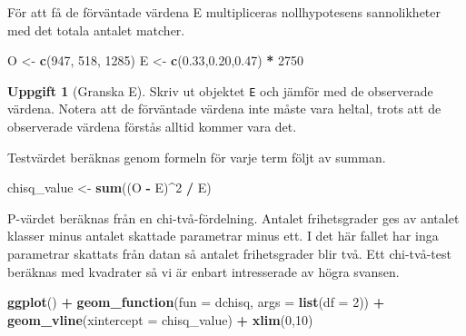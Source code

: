 \documentclass[
]{book}
\newenvironment{Shaded}{\begin{snugshade}}{\end{snugshade}}
\newcommand{\AttributeTok}[1]{\textcolor[rgb]{0.13,0.29,0.53}{#1}}
\newcommand{\DecValTok}[1]{\textcolor[rgb]{0.00,0.00,0.81}{#1}}
\newcommand{\FloatTok}[1]{\textcolor[rgb]{0.00,0.00,0.81}{#1}}
\newcommand{\FunctionTok}[1]{\textcolor[rgb]{0.13,0.29,0.53}{\textbf{#1}}}
\newcommand{\NormalTok}[1]{#1}
\newcommand{\OtherTok}[1]{\textcolor[rgb]{0.56,0.35,0.01}{#1}}
\newcommand{\SpecialCharTok}[1]{\textcolor[rgb]{0.81,0.36,0.00}{\textbf{#1}}}
\theoremstyle{definition}
\theoremstyle{definition}
\theoremstyle{definition}
\newtheorem{exercise}{Uppgift}[chapter]
\theoremstyle{definition}
\theoremstyle{remark}
\begin{document}
För att få de förväntade värdena E multipliceras nollhypotesens sannolikheter med det totala antalet matcher.

\begin{Shaded}
\begin{Highlighting}[]
\NormalTok{O }\OtherTok{\textless{}{-}} \FunctionTok{c}\NormalTok{(}\DecValTok{947}\NormalTok{, }\DecValTok{518}\NormalTok{, }\DecValTok{1285}\NormalTok{)}
\NormalTok{E }\OtherTok{\textless{}{-}} \FunctionTok{c}\NormalTok{(}\FloatTok{0.33}\NormalTok{,}\FloatTok{0.20}\NormalTok{,}\FloatTok{0.47}\NormalTok{) }\SpecialCharTok{*} \DecValTok{2750}
\end{Highlighting}
\end{Shaded}

\begin{exercise}[Granska E]
Skriv ut objektet \texttt{E} och jämför med de observerade värdena. Notera att de förväntade värdena inte måste vara heltal, trots att de observerade värdena förstås alltid kommer vara det.
\end{exercise}

Testvärdet beräknas genom formeln för varje term följt av summan.

\begin{Shaded}
\begin{Highlighting}[]
\NormalTok{chisq\_value }\OtherTok{\textless{}{-}} \FunctionTok{sum}\NormalTok{((O }\SpecialCharTok{{-}}\NormalTok{ E)}\SpecialCharTok{\^{}}\DecValTok{2} \SpecialCharTok{/}\NormalTok{ E)}
\end{Highlighting}
\end{Shaded}

P-värdet beräknas från en chi-två-fördelning. Antalet frihetsgrader ges av antalet klasser minus antalet skattade parametrar minus ett. I det här fallet har inga parametrar skattats från datan så antalet frihetsgrader blir två. Ett chi-två-test beräknas med kvadrater så vi är enbart intresserade av högra svansen.

\begin{Shaded}
\begin{Highlighting}[]
\FunctionTok{ggplot}\NormalTok{() }\SpecialCharTok{+}
  \FunctionTok{geom\_function}\NormalTok{(}\AttributeTok{fun =}\NormalTok{ dchisq, }\AttributeTok{args =} \FunctionTok{list}\NormalTok{(}\AttributeTok{df =} \DecValTok{2}\NormalTok{)) }\SpecialCharTok{+}
  \FunctionTok{geom\_vline}\NormalTok{(}\AttributeTok{xintercept =}\NormalTok{ chisq\_value) }\SpecialCharTok{+}
  \FunctionTok{xlim}\NormalTok{(}\DecValTok{0}\NormalTok{,}\DecValTok{10}\NormalTok{)}
\end{Highlighting}
\end{Shaded}
\end{document}
